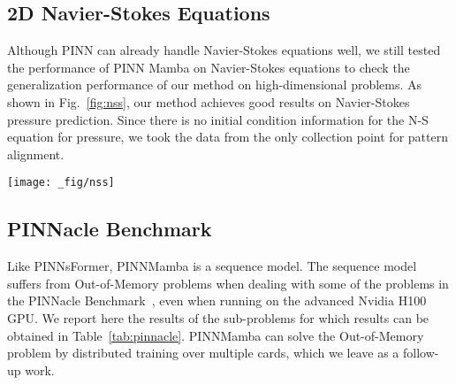\subsection{2D Navier-Stokes Equations}

Although PINN can already handle Navier-Stokes equations well, we still tested the performance of PINN Mamba on Navier-Stokes equations to check the generalization performance of our method on high-dimensional problems. As shown in Fig.~\ref{fig:nss}, our method achieves good results on Navier-Stokes pressure prediction. Since there is no initial condition information for the N-S equation for pressure, we took the data from the only collection point for pattern alignment.

\begin{figure*}[t]
    \centering
    \texttt{[image: \_fig/nss]}
    \vspace{-3mm}
    \caption{The ground truth solution, prediction (top), and absolute error (bottom) on Navier-Stokes equations.}
    \label{fig:nss}
\end{figure*}

\subsection{PINNacle Benchmark}

Like PINNsFormer, PINNMamba is a sequence model. The sequence model suffers from Out-of-Memory problems when dealing with some of the problems in the PINNacle Benchmark~\cite{hao2023pinnacle}, even when running on the advanced Nvidia H100 GPU. We report here the results of the sub-problems for which results can be obtained in Table~\ref{tab:pinnacle}. PINNMamba can solve the Out-of-Memory problem by distributed training over multiple cards, which we leave as a follow-up work.



